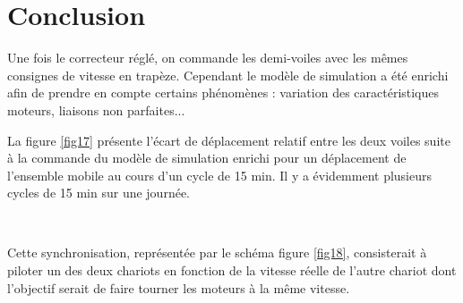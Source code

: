 


\section{Conclusion}

Une fois le correcteur réglé, on commande les demi-voiles avec les mêmes consignes de vitesse en trapèze.
Cependant le modèle de simulation a été enrichi afin de prendre en compte certains phénomènes : variation des caractéristiques moteurs, liaisons non parfaites...

La figure \ref{fig17} présente l'écart de déplacement relatif entre les deux voiles suite à la commande du modèle de simulation enrichi pour un déplacement de l'ensemble mobile au cours d'un cycle de 15 min. Il y a évidemment plusieurs cycles de 15 min sur une journée.



~\

Cette synchronisation, représentée par le schéma figure \ref{fig18}, consisterait à piloter un des deux chariots en fonction de la vitesse réelle de l'autre chariot dont l'objectif serait de faire tourner les moteurs à la même vitesse.






